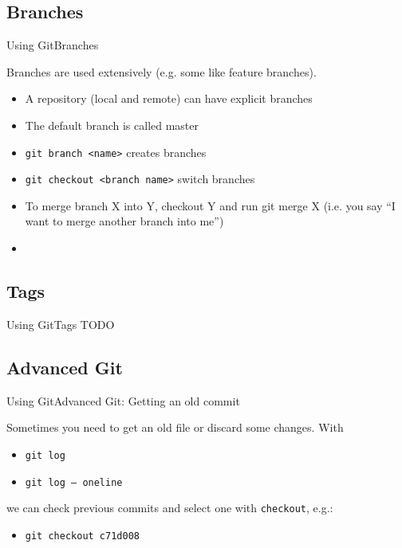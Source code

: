 \documentclass{beamer}
\begin{document}
\subsection{Branches}
\begin{frame}{Using Git}{Branches}

Branches are used extensively (e.g. some like feature branches).

\begin{itemize}
 \item A repository (local and remote) can have explicit branches
 \item The default branch is called master
 \item \texttt{git branch <name>} creates branches
 \item \texttt{git checkout <branch name>} switch branches
 \item To merge branch X into Y, checkout Y and run git merge X
(i.e. you say “I want to merge another branch into me”)
 \item 
\end{itemize}

\end{frame}

\subsection{Tags}
\begin{frame}{Using Git}{Tags}
	TODO
\end{frame}

\subsection{Advanced Git}
\begin{frame}{Using Git}{Advanced Git: Getting an old commit}

Sometimes you need to get an old file or discard some changes. With 

\begin{itemize}
 \item \texttt{git log} 
 \item \texttt{git log -- oneline}
\end{itemize}

we can check previous commits and select one with \texttt{checkout}, e.g.:
\begin{itemize}
 \item \texttt{git checkout c71d008}
\end{itemize}

\end{frame}
\end{document}
